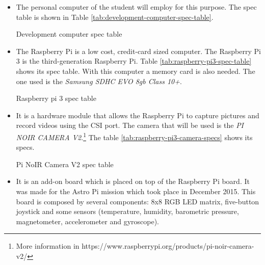 \documentclass{pre-tfg}
\begin{document}
\begin{itemize}
	\item {} The personal computer of the student will employ for this purpose. The spec table is shown in Table \ref{tab:development-computer-spec-table}.
	
	\begin{table}[!h]
		\centering
		{\small
			
		}
		\caption{Development computer spec table}
		\label{tab:development-computer-spec-table}
	\end{table}
	
	\item {} The Raspberry Pi is a low cost, credit-card sized computer. The Raspberry Pi 3 is the third-generation Raspberry Pi. Table \ref{tab:raspberry-pi3-spec-table} shows its spec table. With this computer a memory card is also needed. The one used is the \emph{Samsung SDHC EVO 8gb Class 10+}.
	
	\begin{table}[!h]
		\centering
		{\small
			
		}
		\caption{Raspberry pi 3 spec table}
		\label{tab:raspberry-pi3-spec-table}
	\end{table}
	
	\item {} It is a hardware module that allows the Raspberry Pi to capture pictures and record videos using the CSI port. The camera that will be used is the \emph{PI NOIR CAMERA V2}.\footnote{More information in https://www.raspberrypi.org/products/pi-noir-camera-v2/} The table \ref{tab:raspberry-pi3-camera-specs} shows its specs. \label{itm:Pi-camera-module-v2}
	
	\begin{table}[!h]
		\centering
		{\small
			
		}
		\caption{Pi NoIR Camera V2 spec table}
		\label{tab:raspberry-pi3-camera-specs}
	\end{table}
	
	\item {} It is an add-on board which is placed on top of the Raspberry Pi board. It was made for the Astro Pi mission which took place in December 2015. This board is composed by several components: 8x8 RGB LED matrix, five-button joystick and some sensors (temperature, humidity, barometric pressure, magnetometer, accelerometer and gyroscope).
	

\end{itemize}
\end{document}
